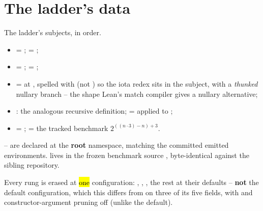 \section{The ladder's data}
\label{sec:capstone:data}

\begin{definition}\label{def:spikeZero}
 \leanok
{} The ladder's subjects, in order.
\begin{itemize}
\item {} = ;  = ;
\item {} = ;  = ;
\item {} =  at , spelled with
 (not ) so the iota redex sits in the subject, with a \emph{thunked} nullary
branch -- the shape Lean's match compiler gives a nullary alternative;
\item {}: the analogous recursive definition;  =  applied
to ;
\item {} = ;  = the tracked benchmark
$2^{((n \cdot 3) - n) + 3}$.
\end{itemize}
\end{definition}

\begin{remark}
-- are declared at the \textbf{root} namespace, matching the
committed emitted environments.  lives in the frozen benchmark source
, byte-identical against the sibling  repository.
\end{remark}

\begin{definition}\label{def:Green-spikeConfig}
 \leanok
{}
 Every rung is erased at \hl{one} configuration: ,
, , the rest at their defaults -- \textbf{not} the default
 configuration, which this differs from on three of its five fields, with
 and constructor-argument pruning off (unlike the default).
\end{definition}

